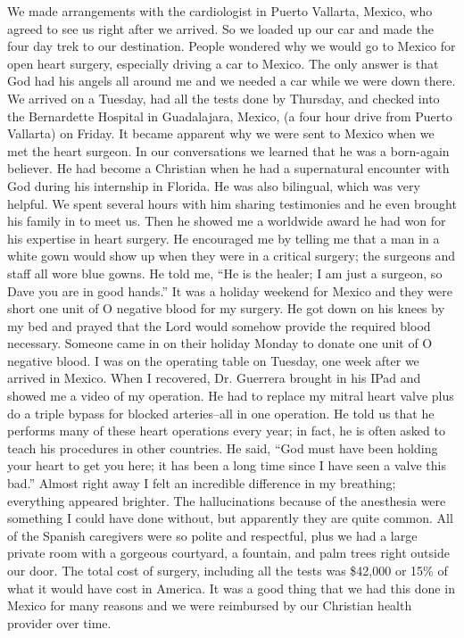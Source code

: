 \documentclass[oneside]{book}
\begin{document}
We made arrangements with the cardiologist in Puerto Vallarta, Mexico, who agreed to see us right after we arrived. So we loaded up our car and made the four day trek to our destination. People wondered why we would go to Mexico for open heart surgery, especially driving a car to Mexico. The only answer is that God had his angels all around me and we needed a car while we were down there. We arrived on a Tuesday, had all the tests done by Thursday, and checked into the Bernardette Hospital in Guadalajara, Mexico, (a four hour drive from Puerto Vallarta) on Friday. It became apparent why we were sent to Mexico when we met the heart surgeon. In our conversations we learned that he was a born-again believer. He had become a Christian when he had a supernatural encounter with God during his internship in Florida. He was also bilingual, which was very helpful. We spent several hours with him sharing testimonies and he even brought his family in to meet us. Then he showed me a worldwide award he had won for his expertise in heart surgery. He encouraged me by telling me that a man in a white gown would show up when they were in a critical surgery; the surgeons and staff all wore blue gowns. He told me, “He is the healer; I am just a surgeon, so Dave you are in good hands.” It was a holiday weekend for Mexico and they were short one unit of O negative blood for my surgery. He got down on his knees by my bed and prayed that the Lord would somehow provide the required blood necessary. Someone came in on their holiday Monday to donate one unit of O negative blood. I was on the operating table on Tuesday, one week after we arrived in Mexico.
When I recovered, Dr. Guerrera brought in his IPad and showed me a video of my operation. He had to replace my mitral heart valve plus do a triple bypass for blocked arteries--all in one operation. He told us that he performs many of these heart operations every year; in fact, he is often asked to teach his procedures in other countries. He said, “God must have been holding your heart to get you here; it has been a long time since I have seen a valve this bad.” Almost right away I felt an incredible difference in my breathing; everything appeared brighter. The hallucinations because of the anesthesia were something I could have done without, but apparently they are quite common. All of the Spanish caregivers were so polite and respectful, plus we had a large private room with a gorgeous courtyard, a fountain, and palm trees right outside our door. The total cost of surgery, including all the tests was \$42,000 or 15\% of what it would have cost in America. It was a good thing that we had this done in Mexico for many reasons and we were reimbursed by our Christian health provider over time. 
\end{document}
